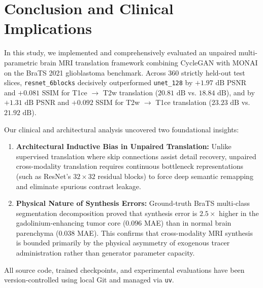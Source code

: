\documentclass[10pt,twocolumn,letterpaper]{article}
\begin{document}
\section{Conclusion and Clinical Implications}
In this study, we implemented and comprehensively evaluated an unpaired multi-parametric brain MRI translation framework combining CycleGAN with MONAI on the BraTS 2021 glioblastoma benchmark. Across 360 strictly held-out test slices, \texttt{resnet\_6blocks} decisively outperformed \texttt{unet\_128} by $+1.97\text{ dB}$ PSNR and $+0.081$ SSIM for T1ce $\to$ T2w translation ($20.81\text{ dB}$ vs. $18.84\text{ dB}$), and by $+1.31\text{ dB}$ PSNR and $+0.092$ SSIM for T2w $\to$ T1ce translation ($23.23\text{ dB}$ vs. $21.92\text{ dB}$). 

Our clinical and architectural analysis uncovered two foundational insights:
\begin{enumerate}
    \item \textbf{Architectural Inductive Bias in Unpaired Translation:} Unlike supervised translation where skip connections assist detail recovery, unpaired cross-modality translation requires continuous bottleneck representations (such as ResNet's $32 \times 32$ residual blocks) to force deep semantic remapping and eliminate spurious contrast leakage.
    \item \textbf{Physical Nature of Synthesis Errors:} Ground-truth BraTS multi-class segmentation decomposition proved that synthesis error is $2.5\times$ higher in the gadolinium-enhancing tumor core ($0.096$ MAE) than in normal brain parenchyma ($0.038$ MAE). This confirms that cross-modality MRI synthesis is bounded primarily by the physical asymmetry of exogenous tracer administration rather than generator parameter capacity.
\end{enumerate}
All source code, trained checkpoints, and experimental evaluations have been version-controlled using local Git and managed via \texttt{uv}.
\end{document}
